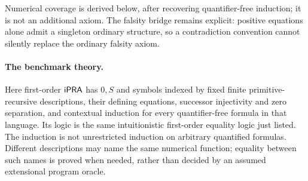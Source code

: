 Numerical coverage is derived below, after recovering quantifier-free induction; it is not an additional axiom. The falsity bridge remains explicit: positive equations alone admit a singleton ordinary structure, so a contradiction convention cannot silently replace the ordinary falsity axiom.

\paragraph{The benchmark theory.}
Here first-order $\mathsf{iPRA}$ has $0,S$ and symbols indexed by fixed finite primitive-recursive descriptions, their defining equations, successor injectivity and zero separation, and contextual induction for every quantifier-free formula in that language. Its logic is the same intuitionistic first-order equality logic just listed. The induction is not unrestricted induction on arbitrary quantified formulas. Different descriptions may name the same numerical function; equality between such names is proved when needed, rather than decided by an assumed extensional program oracle.
